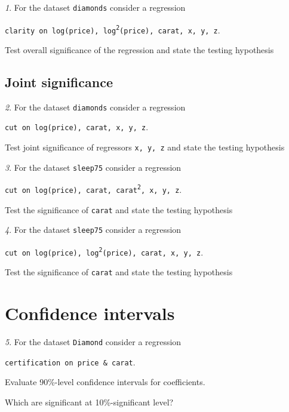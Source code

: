 \documentclass[12pt]{article}
\theoremstyle{remark}
\newtheorem{problem}{}[section]
\begin{document}
\begin{problem}
For the dataset \texttt{diamonds} consider a regression
\begin{center}
	\texttt{clarity on log(price), log\textsuperscript{2}(price), carat, x, y, z}.
\end{center}
Test overall significance of the regression and state the testing hypothesis
\end{problem}

\subsection{Joint significance}

\begin{problem}
For the dataset \texttt{diamonds} consider a regression
\begin{center}
	\texttt{cut on log(price), carat, x, y, z}.
\end{center}
Test joint significance of regressors \texttt{x, y, z} and 
state the testing hypothesis
\end{problem}

\begin{problem}
For the dataset \texttt{sleep75} consider a regression
\begin{center}
	\texttt{cut on log(price), carat, carat\textsuperscript{2}, x, y, z}.
\end{center}
Test the significance of \texttt{carat} and state the testing hypothesis
\end{problem}

\begin{problem}
For the dataset \texttt{sleep75} consider a regression
\begin{center}
	\texttt{cut on log(price), log\textsuperscript{2}(price), carat, x, y, z}.
\end{center}
Test the significance of \texttt{carat} and state the testing hypothesis
\end{problem}
	
\section{Confidence intervals}

\begin{problem}
For the dataset \texttt{Diamond} consider a regression
\begin{center}
	\texttt{certification on price \& carat}.
\end{center}
Evaluate 90\%-level confidence intervals for coefficients.

Which are significant at 10\%-significant level?
\end{problem}
\end{document}
